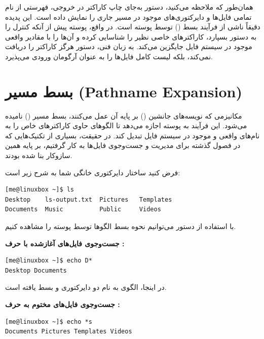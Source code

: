 همان‌طور که ملاحظه می‌کنید، دستور  به‌جای چاپ کاراکتر \cmd{*} در خروجی، فهرستی از نام تمامی فایل‌ها و دایرکتوری‌های موجود در مسیر جاری را نمایش داده است. این پدیده دقیقاً ناشی از فرآیند بسط () توسط پوسته است. در واقع، پوسته پیش از آنکه کنترل را به دستور  بسپارد، کاراکترهای خاصی نظیر \cmd{*} را شناسایی کرده و آن‌ها را با مقادیر واقعی موجود در سیستم فایل جایگزین می‌کند. به زبان فنی، دستور  هرگز کاراکتر \cmd{*} را دریافت نمی‌کند، بلکه لیست کامل فایل‌ها را به عنوان آرگومان ورودی می‌پذیرد.

\section{بسط مسیر (Pathname Expansion)}

مکانیزمی که نویسه‌های جانشین () بر پایه آن عمل می‌کنند، بسط مسیر () نامیده می‌شود. این فرآیند به پوسته اجازه می‌دهد تا الگوهای حاوی کاراکترهای خاص را به نام‌های واقعی و موجود در سیستم‌ فایل تبدیل کند. در حقیقت، بسیاری از تکنیک‌هایی که در فصول گذشته برای مدیریت و جست‌وجوی فایل‌ها به کار گرفتیم، بر پایه همین سازوکار بنا شده بودند.

فرض کنید ساختار دایرکتوری خانگی شما به شرح زیر است:

\begin{latin}
\begin{lstlisting}
[me@linuxbox ~]$ ls
Desktop    ls-output.txt  Pictures   Templates
Documents  Music          Public     Videos
\end{lstlisting}
\end{latin}

با استفاده از دستور  می‌توانیم نحوه بسط الگوها توسط پوسته را مشاهده کنیم.

\textbf{جست‌وجوی فایل‌های آغازشده با حرف :}

\begin{latin}
\begin{lstlisting}
[me@linuxbox ~]$ echo D*
Desktop Documents
\end{lstlisting}
\end{latin}

در اینجا، الگوی  به نام دو دایرکتوری  و  بسط یافته است.

\textbf{جست‌وجوی فایل‌های مختوم به حرف :}

\begin{latin}
\begin{lstlisting}
[me@linuxbox ~]$ echo *s
Documents Pictures Templates Videos
\end{lstlisting}
\end{latin}

